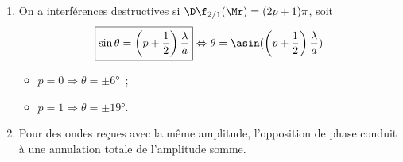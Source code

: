 \documentclass[a4paper, 12pt, final, garamond]{book}
\begin{document}
\begin{enumerate}
\begin{enumerate}
            \item On a interférences destructives si $\D\f_{2/1}(\Mr) =
                (2p+1)\pi$, soit
                \[
                    \boxed{\sin\theta = \left(p+\frac{1}{2}\right) \frac{\lambda}{a}}
                    \Leftrightarrow
                    \theta = \asin(\left(p+\frac{1}{2}\right) \frac{\lambda}{a})
                \]
                \begin{itemize}
                    \item $p=0 \Rightarrow \theta = \pm\ang{6;;}$~;
                    \item $p=1 \Rightarrow \theta = \pm\ang{19;;}$.
                \end{itemize}
            \item Pour des ondes reçues avec la même amplitude, l'opposition de
                phase conduit à une annulation totale de l'amplitude somme.
        \end{enumerate}
\end{enumerate}
\end{document}
